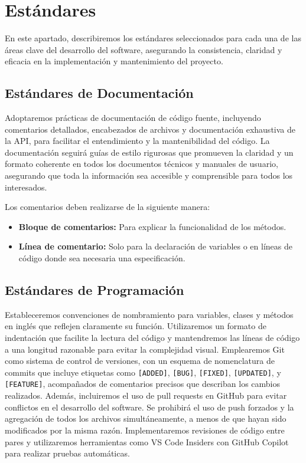 \chapter{Estándares}

En este apartado, describiremos los estándares seleccionados para cada una 
de las áreas clave del desarrollo del software, asegurando la consistencia, 
claridad y eficacia en la implementación y mantenimiento del proyecto.

\section{\textbf{Estándares de Documentación}}

Adoptaremos prácticas de documentación de código fuente, incluyendo comentarios detallados, 
encabezados de archivos y documentación exhaustiva de la API, para facilitar el entendimiento 
y la mantenibilidad del código. La documentación seguirá guías de estilo rigurosas que promueven
la claridad y un formato coherente en todos los documentos técnicos y manuales de usuario, 
asegurando que toda la información sea accesible y comprensible para todos los interesados.

Los comentarios deben realizarse de la siguiente manera:
\begin{itemize}
    \item \textbf{Bloque de comentarios:} Para explicar la funcionalidad de los métodos.
    \item \textbf{Línea de comentario:} Solo para la declaración de variables o en líneas de 
    código donde sea necesaria una especificación.
\end{itemize}

\section{\textbf{Estándares de Programación}}

Estableceremos convenciones de nombramiento para variables, clases y métodos en 
inglés que reflejen claramente su función. Utilizaremos un formato de indentación que 
facilite la lectura del código y mantendremos las líneas de código a una longitud razonable 
para evitar la complejidad visual. Emplearemos Git como sistema de control de versiones, con un 
esquema de nomenclatura de commits que incluye etiquetas como \texttt{[ADDED]}, \texttt{[BUG]}, 
\texttt{[FIXED]}, \texttt{[UPDATED]}, y \texttt{[FEATURE]}, acompañados de comentarios precisos 
que describan los cambios realizados. Además, incluiremos el uso de pull requests en GitHub para 
evitar conflictos en el desarrollo del software. Se prohibirá el uso de push forzados y la 
agregación de todos los archivos simultáneamente, a menos de que hayan sido modificados 
por la misma razón. Implementaremos revisiones de código entre pares y utilizaremos 
herramientas como VS Code Insiders con GitHub Copilot para realizar pruebas automáticas.

